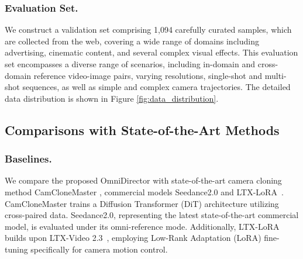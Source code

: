 \documentclass[letterpaper]{article} %
\begin{document}
\subsubsection{Evaluation Set.} We construct a validation set comprising 1,094 carefully curated samples, which are collected from the web, covering a wide range of domains including advertising, cinematic content, and several complex visual effects. This evaluation set encompasses a diverse range of scenarios, including in-domain and cross-domain reference video-image pairs, varying resolutions, single-shot and multi-shot sequences, as well as simple and complex camera trajectories. The detailed data distribution is shown in Figure \ref{fig:data_distribution}.

\subsection{Comparisons with State-of-the-Art Methods}
\subsubsection{Baselines.} We compare the proposed OmniDirector with state-of-the-art camera cloning method CamCloneMaster \cite{luo2025camclonemaster}, commercial models Seedance2.0 \cite{seedance2026seedance} and LTX-LoRA~\cite{cseti2024ltx23}. CamCloneMaster trains a Diffusion Transformer (DiT) architecture utilizing cross-paired data. Seedance2.0, representing the latest state-of-the-art commercial model, is evaluated under its omni-reference mode. Additionally, LTX-LoRA builds upon LTX-Video 2.3~\cite{hacohen2025ltx2}, employing Low-Rank Adaptation (LoRA) fine-tuning specifically for camera motion control. 
\end{document}
